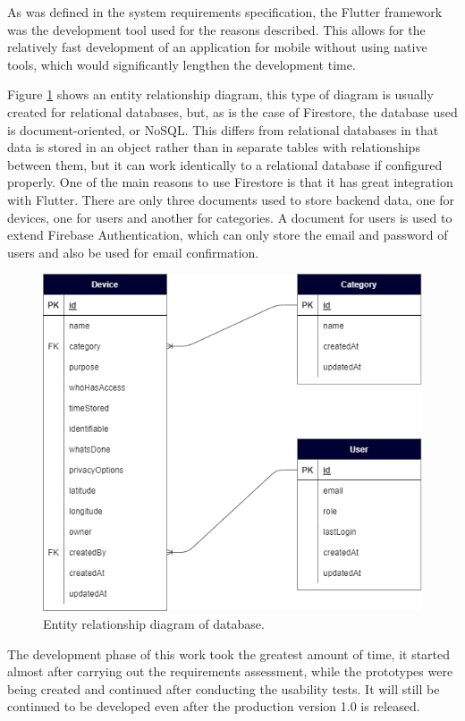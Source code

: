 As was defined in the system requirements specification, the Flutter
framework was the development tool used for the reasons described.
This allows for the relatively fast development of an application for
mobile without using native tools, which would significantly lengthen the
development time.

Figure \ref{fig:dbmodel} shows an entity relationship diagram, this type of
diagram is usually created for relational databases, but, as is the case of
Firestore, the database used is document-oriented, or NoSQL. This differs from
relational databases in that data is stored in an object rather than in separate
tables with relationships between them, but it can work identically to a relational
database if configured properly. One of the main reasons to use Firestore is that
it has great integration with Flutter. There are only three documents used to
store backend data, one for \hyperlink{\acronym}{\acronym} devices, one for users and another for categories.
A document for users is used to extend Firebase Authentication, which can only
store the email and password of users and also be used for email confirmation.

\begin{figure}[H]
    \centering
    \includegraphics[width=340pt]{../assets/images/erdiagram.png}
    \caption{Entity relationship diagram of database.}
    \label{fig:dbmodel}
\end{figure}

The development phase of this work took the greatest amount of time,
it started almost after carrying out the requirements assessment, while
the prototypes were being created and continued after conducting the
usability tests. It will still be continued to be developed even after
the production version 1.0 is released.

